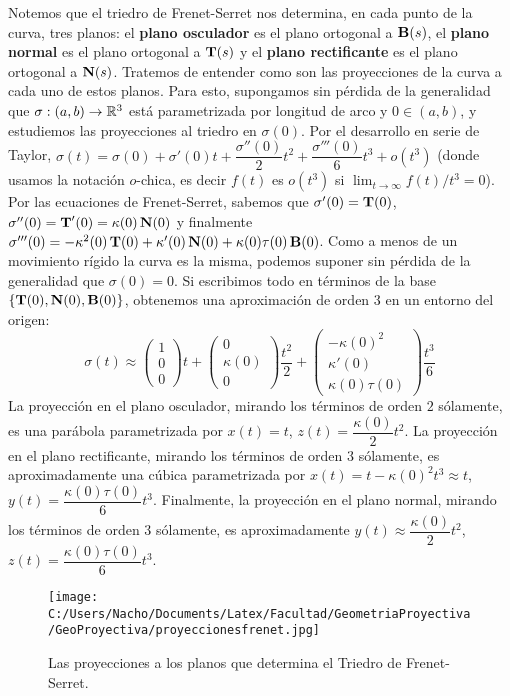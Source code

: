 Notemos que el triedro de Frenet-Serret nos determina, en cada punto de la curva, tres planos: el \textbf{plano osculador} es el plano ortogonal a $\operatorname{\mathbf{B}}(s)$, el \textbf{plano normal} es el plano ortogonal a $\operatorname{\mathbf{T}}(s)$ y el \textbf{plano rectificante} es el plano ortogonal a $\operatorname{\mathbf{N}}(s)$. Tratemos de entender como son las proyecciones de la curva a cada uno de estos planos. Para esto, supongamos sin pérdida de la generalidad que $\sigma:(a,b)\to\mathbb{R}^3$ está parametrizada por longitud de arco y $0\in (a,b)$, y estudiemos las proyecciones al triedro en $\sigma(0)$. Por el desarrollo en serie de Taylor, $\sigma(t)=\sigma(0)+\sigma'(0)t + \dfrac{\sigma''(0)}{2}t^2 + \dfrac{\sigma'''(0)}{6}t^3+ o(t^3)$ (donde usamos la notación $o$-chica, es decir $f(t)$ es $o(t^3)$ si $\displaystyle\lim_{t\to\infty}f(t)/t^3=0$). Por las ecuaciones de Frenet-Serret, sabemos que $\sigma'(0)=\operatorname{\mathbf{T}}(0)$, $\sigma''(0)=\operatorname{\mathbf{T}}'(0)=\kappa(0)\operatorname{\mathbf{N}}(0)$ y finalmente $\sigma'''(0)=-\kappa^2(0)\operatorname{\mathbf{T}}(0)+\kappa'(0)\operatorname{\mathbf{N}}(0) + \kappa(0)\tau(0)\operatorname{\mathbf{B}}(0)$. Como a menos de un movimiento rígido la curva es la misma, podemos suponer sin pérdida de la generalidad que $\sigma(0)=0$. Si escribimos todo en términos de la base $\{\operatorname{\mathbf{T}}(0),\operatorname{\mathbf{N}}(0),\operatorname{\mathbf{B}}(0)\}$, obtenemos una aproximación de orden $3$ en un entorno del origen: $$\sigma(t)\approx\begin{pmatrix}1\\ 0\\ 0\end{pmatrix}t + \begin{pmatrix}0\\ \kappa(0)\\ 0\end{pmatrix}\dfrac{t^2}{2} + \begin{pmatrix}-\kappa(0)^2\\ \kappa'(0) \\ \kappa(0)\tau(0)\end{pmatrix}\dfrac{t^3}{6}$$
La proyección en el plano osculador, mirando los términos de orden $2$ sólamente, es una parábola parametrizada por $x(t)=t$, $z(t)=\dfrac{\kappa(0)}{2}t^2$. La proyección en el plano rectificante, mirando los términos de orden $3$ sólamente, es aproximadamente una cúbica parametrizada por $x(t)=t-\kappa(0)^2 t^3\approx t$, $y(t)=\dfrac{\kappa(0)\tau(0)}{6}t^3$. Finalmente, la proyección en el plano normal, mirando los términos de orden $3$ sólamente, es aproximadamente $y(t)\approx\dfrac{\kappa(0)}{2}t^2$, $z(t)=\dfrac{\kappa(0)\tau(0)}{6}t^3$.


\begin{figure}[h]
	\centering
		\texttt{[image: C:/Users/Nacho/Documents/Latex/Facultad/GeometriaProyectiva/GeoProyectiva/proyeccionesfrenet.jpg]}
	\caption{Las proyecciones a los planos que determina el Triedro de Frenet-Serret.}
	\label{fig:proyeccionesfrenet}
\end{figure}



